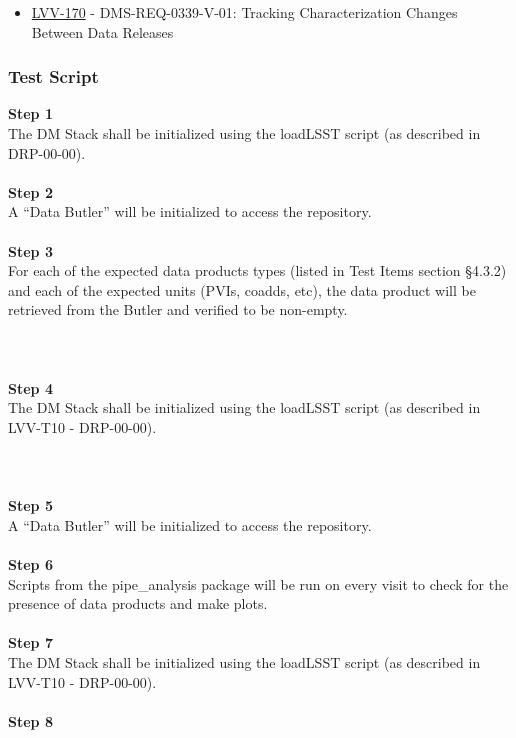 \begin{itemize}
\tightlist
\item
  \href{https://jira.lsstcorp.org/browse/LVV-170}{LVV-170} -
  DMS-REQ-0339-V-01: Tracking Characterization Changes Between Data
  Releases
\end{itemize}

\hypertarget{test-script-172}{%
\subsubsection{Test Script}\label{test-script-172}}

\textbf{Step 1}\\
The DM Stack shall be initialized using the loadLSST script (as
described in DRP-00-00).\\
~\\
\textbf{Step 2}\\
A ``Data Butler'' will be initialized to access the repository.\\
~\\
\textbf{Step 3}\\
For each of the expected data products types (listed in Test Items
section §4.3.2) and each of the expected units (PVIs, coadds, etc), the
data product will be retrieved from the Butler and verified to be
non-empty.\\
~\\
~\\
~\\
\textbf{Step 4}\\
The DM Stack shall be initialized using the loadLSST script (as
described in LVV-T10 - DRP-00-00).\\
~\\
~\\
~\\
\textbf{Step 5}\\
A ``Data Butler'' will be initialized to access the repository.\\
~\\
\textbf{Step 6}\\
Scripts from the pipe\_analysis package will be run on every visit to
check for the presence of data products and make plots.\\
~\\
\textbf{Step 7}\\
The DM Stack shall be initialized using the loadLSST script (as
described in LVV-T10 - DRP-00-00).\\
~\\
\textbf{Step 8}\\

